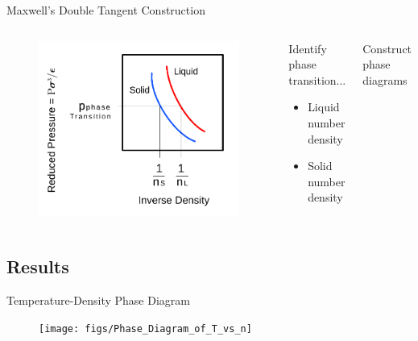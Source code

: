 \documentclass{beamer}
\begin{document}
\begin{frame}{Maxwell's Double Tangent Construction}
	\begin{columns}[t]
        \begin{figure}
            \centering
            \includegraphics[width=\columnwidth]{figs/MaxwellDTC-Fig3.pdf}
          \end{figure}
		\begin{block}{Identify phase transition...}
			\begin{itemize}
				\item Liquid number density
				\item Solid number density
			\end{itemize}
		\end{block}
		\begin{block}{Construct phase diagrams}
	    \end{block}
	\end{columns}	
\end{frame}


\subsection*{Results}
\begin{frame}{Temperature-Density Phase Diagram}
    \begin{figure}
        \centering
        \texttt{[image: figs/Phase\_Diagram\_of\_T\_vs\_n]}
        \label{fig:Phase_Diagram_of_T_vs_n}
    \end{figure}
\end{frame}
\end{document}
